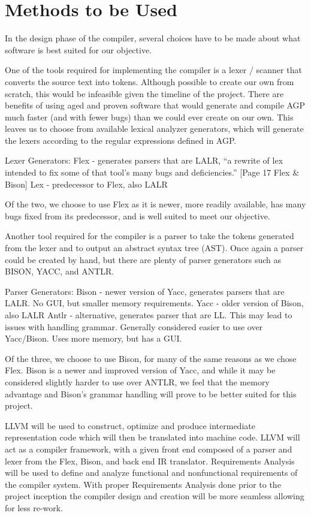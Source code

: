 \documentclass[11pt]{article}
\begin{document}
\section{Methods to be Used}

In the design phase of the compiler, several choices have to be made about what software is best suited for our objective. 

One of the tools required for implementing the compiler is a lexer / scanner that converts the source text into tokens. Although possible to create our own from scratch, this would be infeasible given the timeline of the project. There are benefits of using aged and proven software that would generate and compile AGP much faster (and with fewer bugs) than we could ever create on our own. This leaves us to choose from available lexical analyzer generators, which will generate the lexers according to the regular expressions defined in AGP.

Lexer Generators:
Flex - generates parsers that are LALR, “a rewrite of lex intended to fix some of that tool’s many bugs and deficiencies.” [Page 17 Flex \& Bison]
Lex - predecessor to Flex, also LALR

Of the two, we choose to use Flex as it is newer, more readily available, has many bugs fixed from its predecessor, and is well suited to meet our objective. 

Another tool required for the compiler is a parser to take the tokens generated from the lexer and to output an abstract syntax tree (AST). Once again a parser could be created by hand, but there are plenty of parser generators such as BISON, YACC, and ANTLR.

Parser Generators:
Bison - newer version of Yacc, generates parsers that are LALR. No GUI, but smaller memory requirements.
Yacc - older version of Bison, also LALR
Antlr - alternative, generates parser that are LL. This may lead to issues with handling grammar. Generally considered easier to use over Yacc/Bison. Uses more memory, but has a GUI.

Of the three, we choose to use Bison, for many of the same reasons as we chose Flex. Bison is a newer and improved version of Yacc, and while it may be considered slightly harder to use over ANTLR, we feel that the memory advantage and Bison’s grammar handling will prove to be better suited for this project.

 LLVM will be used to construct, optimize and produce intermediate representation code which will then be translated into machine code. LLVM will act as a compiler framework, with a given front end composed of a parser and lexer from the Flex, Bison, and back end IR translator. Requirements Analysis will be used to define and analyze functional and nonfunctional requirements of the compiler system. With proper Requirements Analysis done prior to the project inception the compiler design and creation will be more seamless allowing for less re-work. 
\end{document}
